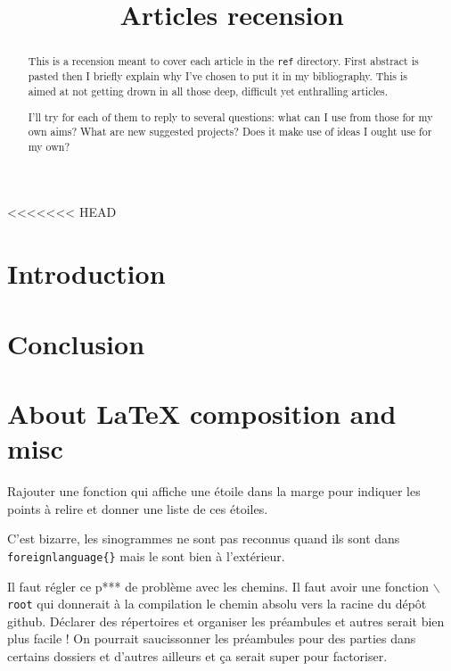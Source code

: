 \documentclass[12pt,onecolumn]{article} %
\title{Articles recension}
\author{}
\begin{document}
\maketitle
{}
\begin{abstract}
\par This is a recension meant to cover each article in the \texttt{ref} directory. First abstract is pasted then I briefly explain why I've chosen to put it in my bibliography. This is aimed at not getting drown in all those deep, difficult yet enthralling articles.\par I'll try for each of them to reply to several questions: what can I use from those for my own aims? What are new suggested projects? Does it make use of ideas I ought use for my own?
\end{abstract}
<<<<<<< HEAD

\tableofcontents
\cleardoublepage

\section*{Introduction}

\section{}


\section*{Conclusion}

\section*{About \LaTeX{} composition and misc}
Rajouter une fonction qui affiche une étoile dans la marge pour indiquer les points à relire et donner une liste de ces étoiles.

C'est bizarre, les sinogrammes ne sont pas reconnus quand ils sont dans \texttt{foreignlanguage\{\}} mais le sont bien à l'extérieur.

Il faut régler ce p*** de problème avec les chemins. Il faut avoir une fonction \texttt{$\backslash$root} qui donnerait à la compilation le chemin absolu vers la racine du dépôt github. Déclarer des répertoires et organiser les préambules et autres serait bien plus facile ! On pourrait saucissonner les préambules pour des parties dans certains dossiers et d'autres ailleurs et ça serait super pour factoriser.
\end{document}
